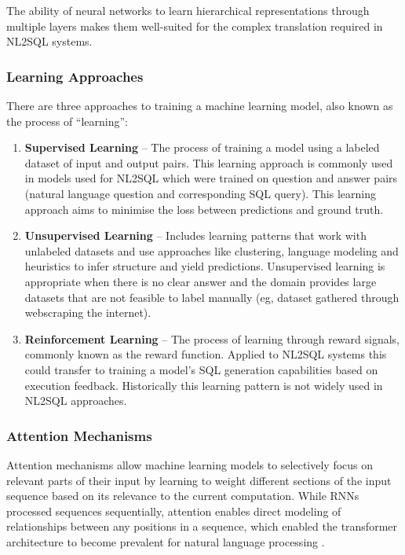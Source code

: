 The ability of neural networks to learn hierarchical representations through
multiple layers makes them well-suited for the complex translation required in
NL2SQL systems.

\subsubsection{Learning Approaches}

There are three approaches to training a machine learning model, also known as
the process of ``learning'':

\begin{enumerate}
    \item \textbf{Supervised Learning} – The process of training a model using
        a labeled dataset of input and output pairs. This learning approach is
        commonly used in models used for NL2SQL which were trained on question
        and answer pairs (natural language question and corresponding SQL
        query). This learning approach aims to minimise the loss between
        predictions and ground truth.
    \item \textbf{Unsupervised Learning} – Includes learning patterns that work
        with unlabeled datasets and use approaches like clustering, language
        modeling and heuristics to infer structure and yield predictions.
        Unsupervised learning is appropriate when there is no clear answer and
        the domain provides large datasets that are not feasible to label
        manually (eg, dataset gathered through webscraping the internet).
    \item \textbf{Reinforcement Learning} – The process of learning through
        reward signals, commonly known as the reward function. Applied to
        NL2SQL systems this could transfer to training a model's SQL generation
        capabilities based on execution feedback. Historically this learning
        pattern is not widely used in NL2SQL approaches.
\end{enumerate}

\subsubsection{Attention Mechanisms}

Attention mechanisms allow machine learning models to selectively focus on
relevant parts of their input by learning to weight different sections of the
input sequence based on its relevance to the current computation. While RNNs
processed sequences sequentially, attention enables direct modeling of
relationships between any positions in a sequence, which enabled the
transformer architecture to become prevalent for natural language processing
\citep{Attention}.

